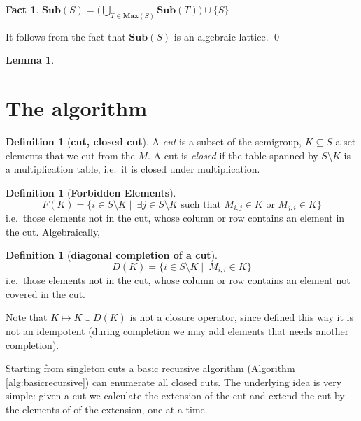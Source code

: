 \documentclass{amsart}
\newcommand{\Sub}{\mathbf{Sub}}
\newcommand{\Max}{\mathbf{Max}}
\theoremstyle{plain}
\newtheorem{lemma}[theorem]{Lemma}
\newtheorem{fact}[theorem]{Fact}
\theoremstyle{definition}
\newtheorem{definition}[theorem]{Definition}
\begin{document}
\begin{fact}
$\Sub(S)=\big( \bigcup_{T\in \Max(S)}\Sub(T)\big)\cup \{S\}$
\end{fact}
\proof
It follows from the fact that $\Sub(S)$ is an algebraic lattice.
\qed

\begin{lemma}

\end{lemma}

\section{The algorithm}
\begin{definition}[\textbf{cut, closed cut}]
A \emph{cut} is a subset of the semigroup, $K\subseteq S$ a set elements that we cut from the $M$.  A cut is \emph{closed} if the table spanned by $S\setminus K$ is a multiplication table, i.e.\ it is closed under multiplication.
\end{definition}

\begin{definition}[\textbf{Forbidden Elements}]
$$F(K)=\{i\in S\setminus K \mid\ \exists j\in S\setminus K \text{ such that } M_{i,j}\in K \text{ or } M_{j,i}\in K\} $$
\noindent i.e.\ those elements not in the cut, whose column or row contains an element in the cut.
Algebraically, 
\end{definition}



\begin{definition}[\textbf{diagonal completion of a cut}]
$$D(K)=\{i\in S\setminus K \mid\ M_{i,i}\in K \} $$
\noindent i.e.\ those elements not in the cut, whose column or row contains an element not covered in the cut.
\end{definition}


Note that $K\mapsto K\cup D(K)$ is not a closure operator, since defined this way it is not an idempotent (during completion we may add elements that needs another completion).

 Starting from singleton cuts a basic recursive algorithm (Algorithm \ref{alg:basicrecursive}) can enumerate all closed cuts. The underlying idea is very simple: given a cut we calculate the extension of the cut and extend the cut by the elements of of the extension, one at a time. 
\end{document}
